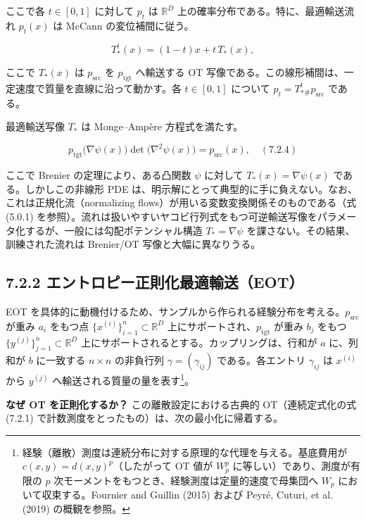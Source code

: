 ここで各 $t\in[0,1]$ に対して $p_t$ は $\mathbb{R}^D$ 上の確率分布である。特に、最適輸送流れ $p_t(x)$ は McCann の変位補間に従う。

\[
T_*^t(x)=(1-t)x+t\,T_*(x),
\]


ここで $T_*(x)$ は $p_{\mathrm{src}}$ を $p_{\mathrm{tgt}}$ へ輸送する OT 写像である。この線形補間は、一定速度で質量を直線に沿って動かす。各 $t\in[0,1]$ について $p_t=T_*^t{}_{\#}p_{\mathrm{src}}$ である。



最適輸送写像 $T_*$ は Monge–Ampère 方程式を満たす。

\[
p_{\mathrm{tgt}}\bigl(\nabla\psi(x)\bigr)\det\bigl(\nabla^2\psi(x)\bigr)=p_{\mathrm{src}}(x),
\quad (7.2.4)
\]


ここで Brenier の定理により、ある凸関数 $\psi$ に対して $T_*(x)=\nabla\psi(x)$ である。しかしこの非線形 PDE は、明示解にとって典型的に手に負えない。なお、これは正規化流（normalizing flows）が用いる変数変換関係そのものである（式 (5.0.1) を参照）。流れは扱いやすいヤコビ行列式をもつ可逆輸送写像をパラメータ化するが、一般には勾配ポテンシャル構造 $T_*=\nabla\psi$ を課さない。その結果、訓練された流れは Brenier/OT 写像と大幅に異なりうる。

\subsection*{7.2.2 エントロピー正則化最適輸送（EOT）}


EOT を具体的に動機付けるため、サンプルから作られる経験分布を考える。$p_{\mathrm{src}}$ が重み $a_i$ をもつ点 $\{x^{(i)}\}_{i=1}^n\subset\mathbb{R}^D$ 上にサポートされ、$p_{\mathrm{tgt}}$ が重み $b_j$ をもつ $\{y^{(j)}\}_{j=1}^n\subset\mathbb{R}^D$ 上にサポートされるとする。カップリングは、行和が $a$ に、列和が $b$ に一致する $n\times n$ の非負行列 $\gamma=(\gamma_{ij})$ である。各エントリ $\gamma_{ij}$ は $x^{(i)}$ から $y^{(j)}$ へ輸送される質量の量を表す\footnote{経験（離散）測度は連続分布に対する原理的な代理を与える。基底費用が $c(x,y)=d(x,y)^p$（したがって OT 値が $W_p^p$ に等しい）であり、測度が有限の $p$ 次モーメントをもつとき、経験測度は定量的速度で母集団へ $W_p$ において収束する。Fournier and Guillin (2015) および Peyré, Cuturi, et al. (2019) の概観を参照。}。

\textbf{なぜ OT を正則化するか？} この離散設定における古典的 OT（連続定式化の式 (7.2.1) で計数測度をとったもの）は、次の最小化に帰着する。

